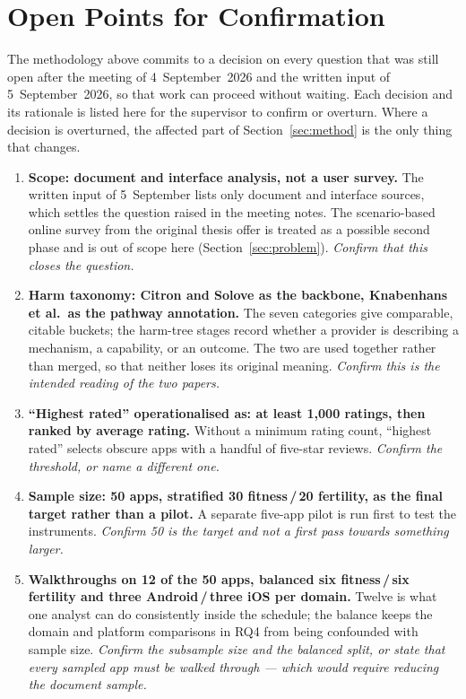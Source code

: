 \section{Open Points for Confirmation}
\label{sec:openpoints}

The methodology above commits to a decision on every question that was still
open after the meeting of 4~September~2026 and the written input of
5~September~2026, so that work can proceed without waiting. Each decision and
its rationale is listed here for the supervisor to confirm or overturn. Where a
decision is overturned, the affected part of Section~\ref{sec:method} is the
only thing that changes.

\begin{enumerate}[leftmargin=*,itemsep=5pt]
  \item \textbf{Scope: document and interface analysis, not a user survey.}
    The written input of 5~September lists only document and interface sources,
    which settles the question raised in the meeting notes. The scenario-based
    online survey from the original thesis offer is treated as a possible second
    phase and is out of scope here (Section~\ref{sec:problem}).
    \emph{Confirm that this closes the question.}

  \item \textbf{Harm taxonomy: Citron and Solove as the backbone, Knabenhans et
    al.\ as the pathway annotation.} The seven categories give comparable,
    citable buckets; the harm-tree stages record whether a provider is
    describing a mechanism, a capability, or an outcome. The two are used
    together rather than merged, so that neither loses its original meaning.
    \emph{Confirm this is the intended reading of the two papers.}

  \item \textbf{\enquote{Highest rated} operationalised as: at least 1{,}000
    ratings, then ranked by average rating.} Without a minimum rating count,
    \enquote{highest rated} selects obscure apps with a handful of five-star
    reviews. \emph{Confirm the threshold, or name a different one.}

  \item \textbf{Sample size: 50 apps, stratified 30 fitness\,/\,20 fertility, as
    the final target rather than a pilot.} A separate five-app pilot is run
    first to test the instruments. \emph{Confirm 50 is the target and not a
    first pass towards something larger.}

  \item \textbf{Walkthroughs on 12 of the 50 apps, balanced six fitness\,/\,six
    fertility and three Android\,/\,three iOS per domain.} Twelve is what one
    analyst can do consistently inside the schedule; the balance keeps the
    domain and platform comparisons in RQ4 from being confounded with sample
    size. \emph{Confirm the subsample size and the balanced split, or state that
    every sampled app must be walked through --- which would require reducing
    the document sample.}


\end{enumerate}
